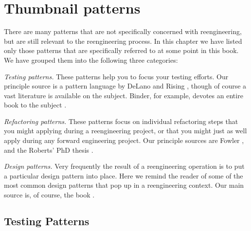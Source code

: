 \documentclass[a4paper,10pt,twoside]{book}
\begin{document}
	\appendix
	\renewcommand{\nnbb}[2]{} %
	\sloppy
\fi
\chapter{Thumbnail patterns}


\label{pat:Adapter}
\label{pat:Facade}

There are many patterns that are not specifically concerned with reengineering, but are still relevant to the reengineering process. In this chapter we have listed only those patterns that are specifically referred to at some point in this book. We have grouped them into the following three categories:

\begin{bulletlist}
\item \emph{Testing patterns.}
These patterns help you to focus your testing efforts. Our principle source is a pattern language by DeLano and Rising \cite{DeLa98a}, though of course a vast literature is available on the subject. Binder, for example, devotes an entire book to the subject \cite{Bind99a}.

\item \emph{Refactoring patterns.}
These patterns focus on individual refactoring steps that you might applying during a reengineering project, or that you might just as well apply during any forward engineering project. Our principle sources are Fowler \etal \cite{Fowl99a}, and the Roberts' PhD thesis \cite{Robe99a}.

\item \emph{Design patterns.}
Very frequently the result of a reengineering operation is to put a particular design pattern into place. Here we remind the reader of some of the most common design patterns that pop up in a reengineering context. Our main source is, of course, the  book \cite{Gamm95a}.
\end{bulletlist}

\section{Testing Patterns}
\end{document}
